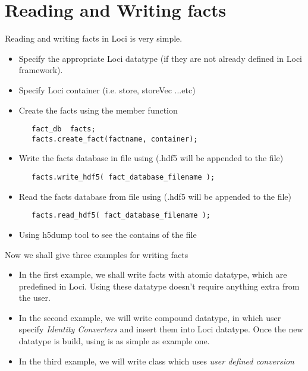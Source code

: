 \section {Reading and Writing facts}
\par Reading and writing facts in Loci is very simple. 
\begin{itemize}
\item  Specify the appropriate Loci datatype 
(if they are not already defined in Loci framework).
\item  Specify Loci container (i.e. store, storeVec ...etc)
\item  Create the facts using the member function
\begin{verbatim}
   fact_db  facts;
   facts.create_fact(factname, container); 
\end{verbatim}
\item  Write the facts database in file using (.hdf5 will be appended
to the file)
\begin{verbatim}
   facts.write_hdf5( fact_database_filename ); 
\end{verbatim}
\item  Read the facts database from file using (.hdf5 will be appended
to the file)
\begin{verbatim}
   facts.read_hdf5( fact_database_filename ); 
\end{verbatim}
\item Using h5dump tool to see the contains of the file
\end{itemize}
%
\par Now we shall give three examples for writing facts
\begin{itemize}
\item  In the first example, we shall write facts with atomic datatype, which
are predefined in Loci. Using these datatype doesn't require anything extra 
from the user.
\item In the second example, we will write compound datatype, in which user
specify {\em Identity Converters} and insert them into Loci datatype. Once the
new datatype is build, using is as simple as example one.
\item In the third example, we will write class which uses {\em user defined conversion}
\end{itemize}
